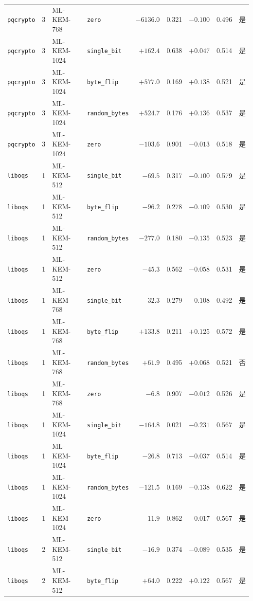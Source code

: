 \documentclass[a4paper,fontset=none]{ctexart}
\begin{document}
{\begin{longtable}[c]{lllp{2.1cm}rrrrr}
  \texttt{pqcrypto} & 3 & ML-KEM-768 & \texttt{zero} & $-6136.0$ & 0.321 & $-0.100$ & 0.496 & 是 \\
  \texttt{pqcrypto} & 3 & ML-KEM-1024 & \texttt{single\_bit} & $+162.4$ & 0.638 & $+0.047$ & 0.514 & 是 \\
  \texttt{pqcrypto} & 3 & ML-KEM-1024 & \texttt{byte\_flip} & $+577.0$ & 0.169 & $+0.138$ & 0.521 & 是 \\
  \texttt{pqcrypto} & 3 & ML-KEM-1024 & \texttt{random\_bytes} & $+524.7$ & 0.176 & $+0.136$ & 0.537 & 是 \\
  \texttt{pqcrypto} & 3 & ML-KEM-1024 & \texttt{zero} & $-103.6$ & 0.901 & $-0.013$ & 0.518 & 是 \\
  \texttt{liboqs} & 1 & ML-KEM-512 & \texttt{single\_bit} & $-69.5$ & 0.317 & $-0.100$ & 0.579 & 是 \\
  \texttt{liboqs} & 1 & ML-KEM-512 & \texttt{byte\_flip} & $-96.2$ & 0.278 & $-0.109$ & 0.530 & 是 \\
  \texttt{liboqs} & 1 & ML-KEM-512 & \texttt{random\_bytes} & $-277.0$ & 0.180 & $-0.135$ & 0.523 & 是 \\
  \texttt{liboqs} & 1 & ML-KEM-512 & \texttt{zero} & $-45.3$ & 0.562 & $-0.058$ & 0.531 & 是 \\
  \texttt{liboqs} & 1 & ML-KEM-768 & \texttt{single\_bit} & $-32.3$ & 0.279 & $-0.108$ & 0.492 & 是 \\
  \texttt{liboqs} & 1 & ML-KEM-768 & \texttt{byte\_flip} & $+133.8$ & 0.211 & $+0.125$ & 0.572 & 是 \\
  \texttt{liboqs} & 1 & ML-KEM-768 & \texttt{random\_bytes} & $+61.9$ & 0.495 & $+0.068$ & 0.521 & 否 \\
  \texttt{liboqs} & 1 & ML-KEM-768 & \texttt{zero} & $-6.8$ & 0.907 & $-0.012$ & 0.526 & 是 \\
  \texttt{liboqs} & 1 & ML-KEM-1024 & \texttt{single\_bit} & $-164.8$ & 0.021 & $-0.231$ & 0.567 & 是 \\
  \texttt{liboqs} & 1 & ML-KEM-1024 & \texttt{byte\_flip} & $-26.8$ & 0.713 & $-0.037$ & 0.514 & 是 \\
  \texttt{liboqs} & 1 & ML-KEM-1024 & \texttt{random\_bytes} & $-121.5$ & 0.169 & $-0.138$ & 0.622 & 是 \\
  \texttt{liboqs} & 1 & ML-KEM-1024 & \texttt{zero} & $-11.9$ & 0.862 & $-0.017$ & 0.567 & 是 \\
  \texttt{liboqs} & 2 & ML-KEM-512 & \texttt{single\_bit} & $-16.9$ & 0.374 & $-0.089$ & 0.535 & 是 \\
  \texttt{liboqs} & 2 & ML-KEM-512 & \texttt{byte\_flip} & $+64.0$ & 0.222 & $+0.122$ & 0.567 & 是 \\

\end{longtable}}
\end{document}

